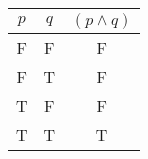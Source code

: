 \begin{tabular}{|c|c||c|}
\hline
$ p $ & $ q $ & $ (p \wedge q) $ \\
\hline
F & F & F \\
F & T & F \\
T & F & F \\
T & T & T \\
\hline
\end{tabular}
